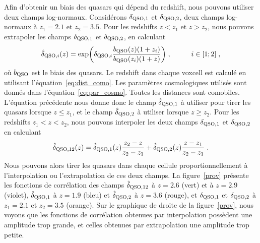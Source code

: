\documentclass[11pt, twoside, a4paper, openright]{report}
\begin{document}
Afin d'obtenir un biais des quasars qui dépend du redshift, nous pouvons utiliser deux champs log-normaux.
Considérons $\delta_{\textsc{QSO},1}$ et $\delta_{\textsc{QSO},2}$, deux champs log-normaux à $z_1 = \num{2.1}$ et $z_2 = \num{3.5}$.
Pour les redshifts $z < z_1$ et $z > z_2$, nous pouvons extrapoler les champs $\delta_{\textsc{QSO},1}$ et $\delta_{\textsc{QSO},2}$,
en calculant
\begin{equation}
  \label{eq:boiteqsointerp1}
  \hat \delta_{\textsc{QSO}, i}(z) = \exp(\delta_{\textsc{QSO},i} \frac{b_{\textsc{QSO}}(z) (1+z_i)}{b_{\textsc{QSO}}(z_i)(1+z)}) \; ,
  \hspace{1cm} i \in [1; 2] \; ,
\end{equation}
où $b_{\textsc{QSO}}$ est le biais des quasars. Le redshift dans chaque voxcell est calculé en utilisant l'équation~\ref{eq:dist_como}. Les paramètres cosmologiques utilisés sont donnés dans l'équation~\ref{eq:par_cosmo}. Toutes les distances sont comobiles.
L'équation précédente nous donne donc le champ $\hat \delta_{\textsc{QSO}, 1}$ à utiliser pour tirer les quasars lorsque $z \leq z_1$, et le champ $\hat \delta_{\textsc{QSO}, 2}$ à utiliser lorsque $z \geq z_2$.
Pour les redshifts $z_1 < z < z_2$, nous pouvons interpoler les deux champs $\delta_{\textsc{QSO},1}$ et $\delta_{\textsc{QSO},2}$ en calculant
\begin{equation}
  \label{eq:boiteqsointerp2}
  \hat \delta_{\textsc{QSO}, 12}(z) = \hat \delta_{\textsc{QSO}, 1}(z) \frac{z_2 - z}{z_2 - z_1} + \hat \delta_{\textsc{QSO}, 2}(z) \frac{z - z_1}{z_2 - z_1} \; .
\end{equation}
Nous pouvons alors tirer les quasars dans chaque cellule proportionnellement à l'interpolation ou l'extrapolation de ces deux champs.
La figure~\ref{prov} présente les fonctions de corrélation des champs $\hat \delta_{\textsc{QSO}, 12}$ à $z=\num{2.6}$ (vert) et à $z = \num{2.9}$ (violet), $\hat \delta_{\textsc{QSO}, 1}$ à $z=\num{1.9}$ (bleu) et $\hat \delta_{\textsc{QSO}, 2}$ à $z=\num{3.6}$ (rouge), et $\delta_{\textsc{QSO},1}$ et $\delta_{\textsc{QSO},2}$ à $z_1 = \num{2.1}$ et $z_2 = \num{3.5}$ (orange). Sur le graphique de droite de la figure~\ref{prov}, nous voyons que les fonctions de corrélation obtenues par interpolation possèdent une amplitude trop grande, et celles obtenues par extrapolation une amplitude trop petite.
\end{document}
